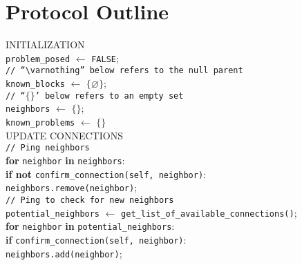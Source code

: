 \documentclass{article}
\begin{document}
\section*{Protocol Outline}
\begin{algorithm}[H]
	INITIALIZATION \\
		\hspace{5mm}\texttt{problem\_posed} $\gets$ \texttt{FALSE}; \\
		\hspace{5mm}\texttt{// ``$\varnothing$'' below refers to the null parent} \\
		\hspace{5mm}\texttt{known\_blocks} $\gets$ $\{\varnothing\}$; \\
		\hspace{5mm}\texttt{// ``$\{\}$' below refers to an empty set} \\
		\hspace{5mm}\texttt{neighbors} $\gets$ $\{\}$; \\
		\hspace{5mm}\texttt{known\_problems} $\gets$ $\{\}$ \\
	UPDATE CONNECTIONS \\
		\hspace{5mm}\texttt{// Ping neighbors} \\
		\hspace{5mm}\textbf{for} \texttt{neighbor} \textbf{in} \texttt{neighbors}: \\
		\hspace{10mm}\textbf{if not} \texttt{confirm\_connection(self, neighbor)}: \\
		\hspace{15mm}\texttt{neighbors.remove(neighbor)}; \\
		\hspace{5mm}\texttt{// Ping to check for new neighbors} \\
		\hspace{5mm}\texttt{potential\_neighbors} $\gets$  \texttt{get\_list\_of\_available\_connections()}; \\
		\hspace{5mm}\textbf{for} \texttt{neighbor} \textbf{in} \texttt{potential\_neighbors}: \\
		\hspace{10mm}\textbf{if} \texttt{confirm\_connection(self, neighbor)}: \\
		\hspace{15mm}\texttt{neighbors.add(neighbor)}; \\

\end{algorithm}
\end{document}

